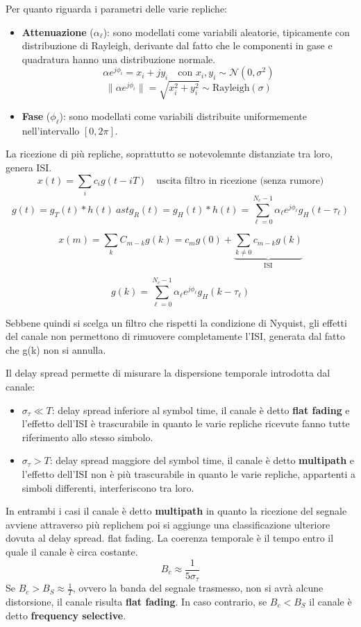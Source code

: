 Per quanto riguarda i parametri delle varie repliche:
\begin{itemize}
    \item \textbf{Attenuazione} ($\alpha_\ell$): sono modellati come variabili aleatorie, tipicamente con distribuzione di Rayleigh, derivante dal fatto che le componenti in gase e quadratura hanno una distribuzione normale.
    \[
        \alpha e^{j\phi_i} = x_i + j y_i \quad \text{con } x_i, y_i \sim \mathcal{N}(0, \sigma^2)
    \]
    \[
        \|\alpha e^{j\phi_i}\| = \sqrt{x_i^2 + y_i^2} \sim \text{Rayleigh}(\sigma)
    \]
    \item \textbf{Fase} ($\phi_\ell$): sono modellati come variabili distribuite uniformemente nell'intervallo $[0, 2\pi]$.
\end{itemize}

La ricezione di più repliche, soprattutto se notevolemnte distanziate tra loro, genera ISI.
\[
    x(t) = \sum_{i} c_i g(t - iT) \quad \text{uscita filtro in ricezione (senza rumore)}
\]
\[
    g(t) = g_T(t) \ast h(t) \ ast g_R(t) = g_H(t) \ast h(t) = \sum_{\ell=0}^{N_c-1} \alpha_{\ell} e^{j\phi_{\ell}} g_H(t - \tau_{\ell})
\]

\[
  x(m) = \sum_{k}  C_{m-k}g(k) = c_m g(0) + \underbrace{\sum_{k \neq 0} c_{m-k} g(k)}_{\text{ISI}}
\]

\[
    g(k) = \sum_{\ell=0}^{N_c-1} \alpha_{\ell} e^{j\phi_{\ell}} g_H(k - \tau_{\ell})
\]

Sebbene quindi si scelga un filtro che rispetti la condizione di Nyquist, gli effetti del canale non permettono di rimuovere completamente l'ISI, generata dal fatto che g(k) non si annulla.


Il delay spread permette di misurare la dispersione temporale introdotta dal canale:
\begin{itemize}
    \item $\sigma_\tau \ll T$: delay spread inferiore al symbol time, il canale è detto \textbf{flat fading}  e l'effetto dell'ISI è trascurabile in quanto le varie repliche ricevute fanno tutte riferimento allo stesso simbolo.
    \item $\sigma_\tau > T$: delay spread maggiore del symbol time, il canale è detto \textbf{multipath} e l'effetto dell'ISI non è più trascurabile in quanto le varie repliche, appartenti a simboli differenti, interferiscono tra loro.
\end{itemize}

In entrambi i casi il canale è detto \textbf{multipath} in quanto la ricezione del segnale avviene attraverso più replichem poi si aggiunge una classificazione ulteriore dovuta al delay spread.
flat fading. La coerenza temporale è il tempo entro il quale il canale è circa costante.
\[
    B_c \approx \frac{1}{5\sigma_\tau}
\]
Se $B_c > B_S \approx \frac{1}{T}$, ovvero la banda del segnale trasmesso, non si avrà alcune distorsione, il canale risulta \textbf{flat fading}. In caso contrario, se $B_c < B_S$ il canale è detto \textbf{frequency selective}. 

